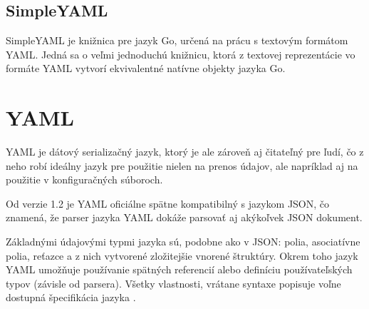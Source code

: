 \subsection{SimpleYAML}
\label{sec:golang:simpleyaml}

SimpleYAML\cite{GolangSimpleyaml} je knižnica pre jazyk Go, určená na prácu s
textovým formátom YAML\@. Jedná sa o veľmi jednoduchú knižnicu, ktorá z textovej
reprezentácie vo formáte YAML vytvorí ekvivalentné natívne objekty jazyka Go.

\section{YAML}
\label{sec:yaml}

YAML je dátový serializačný jazyk, ktorý je ale zároveň aj čitateľný pre ľudí, čo
z neho robí ideálny jazyk pre použitie nielen na prenos údajov, ale napríklad aj na
použitie v konfiguračných súboroch.

Od verzie 1.2 je YAML oficiálne spätne kompatibilný s jazykom JSON\cite{YAMLJSONCompat}, čo znamená,
že parser jazyka YAML dokáže parsovať aj akýkoľvek JSON dokument.

Základnými údajovými typmi jazyka sú, podobne ako v JSON: polia, asociatívne polia, reťazce a z nich
vytvorené zložitejšie vnorené štruktúry. Okrem toho jazyk YAML umožňuje používanie spätných
referencií alebo definíciu používateľských typov (závisle od parsera). Všetky vlastnosti, vrátane
syntaxe popisuje voľne dostupná špecifikácia jazyka \cite{YAMLSpec}.
